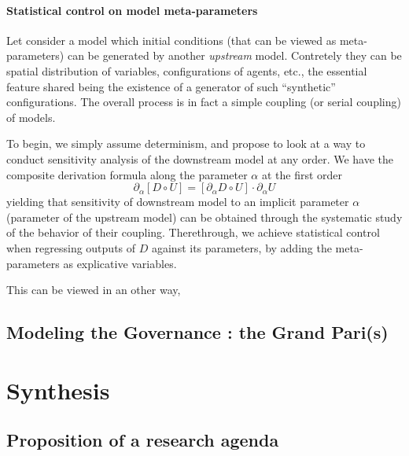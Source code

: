 \paragraph{Statistical control on model meta-parameters}

Let consider a model which initial conditions (that can be viewed as meta-parameters) can be generated by another \emph{upstream} model. Contretely they can be spatial distribution of variables, configurations of agents, etc., the essential feature shared being the existence of a generator of such ``synthetic'' configurations. The overall process is in fact a simple coupling (or serial coupling) of models.

To begin, we simply assume determinism, and propose to look at a way to conduct sensitivity analysis of the downstream model at any order. We have the composite derivation formula along the parameter $\alpha$ at the first order
\[
\partial_{\alpha}[D \circ U] = [\partial_{\alpha} D \circ U ]\cdot \partial_{\alpha} U
\]
yielding that sensitivity of downstream model to an implicit parameter $\alpha$ (parameter of the upstream model) can be obtained through the systematic study of the behavior of their coupling. Therethrough, we achieve statistical control when regressing outputs of $D$ against its parameters, by adding the meta-parameters as explicative variables.

This can be viewed in an other way, 


\subsection{Modeling the Governance : the Grand Pari(s)}




\section{Synthesis}


\subsection{Proposition of a research agenda}





